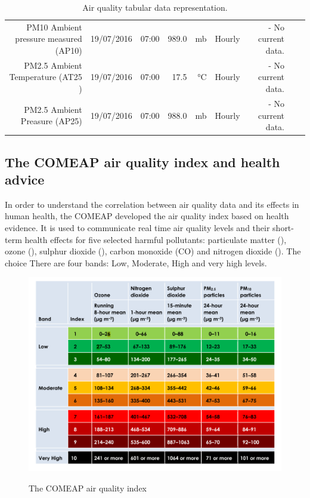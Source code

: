 \begin{table}[ht]
\begin{adjustbox}{width=1.2\textwidth,center=\textwidth}
\begin{tabular}{rlrrrrrrr}
	PM10 Ambient pressure measured (AP10) & 19/07/2016 & 07:00 & 989.0 & mb & Hourly & - No current data. \\
	PM2.5 Ambient Temperature (AT25 ) & 19/07/2016 & 07:00 & 17.5 & °C & Hourly & - No current data. \\
	PM2.5 Ambient Preasure (AP25) & 19/07/2016 & 07:00 & 988.0 & mb & Hourly & - No current data. \\
   \hline
\end{tabular}
\end{adjustbox}
\caption{Air quality tabular data representation. \cite{DepartmentforEnvironment}}
\label{tab:pollution_tabular_data}
\end{table} 

\subsection{The COMEAP air quality index and health advice}
In order to understand the correlation between air quality data and its effects in human health, the \ac{COMEAP} developed the air quality index based on health evidence. It is used to communicate real time air quality levels and their short-term health effects for five selected harmful pollutants: particulate matter (\PMTEN), ozone (\OTHREE), sulphur dioxide (\SOTWO), carbon monoxide (CO) and nitrogen dioxide (\NOTWO). The choice 
There are four bands: Low, Moderate, High and very high levels. 

\begin{figure}[H]
\begin{adjustbox}{width=1\textwidth,center=\textwidth}
  \centering
  \includegraphics[scale=.8]{images/air_quality_index.png}
  \label{fig:air_quality_index}
\end{adjustbox}
  \caption[The COMEAP air quality index]{The COMEAP air quality index \cite{HealthProtectionAgencyfortheCommitteeontheMedicalEffectsofAirPollutants2011}}
\end{figure}

